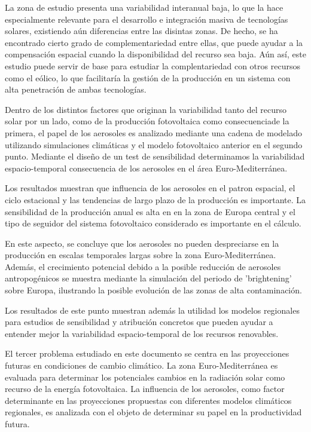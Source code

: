 La zona de estudio presenta una variabilidad interanual baja, lo que la hace especialmente relevante para el desarrollo e integración masiva de tecnologías solares, existiendo aún diferencias entre las disintas zonas. De hecho, se ha encontrado cierto grado de complementariedad entre ellas, que puede ayudar a la compensación espacial cuando la disponibilidad del recurso sea baja. Aún así, este estudio puede servir de base para estudiar la complentariedad con otros recursos como el eólico, lo que facilitaría la gestión de la producción en un sistema con alta penetración de ambas tecnologías.

Dentro de los distintos factores que originan la variabilidad tanto del recurso solar por un lado, como de la producción fotovoltaica como consecuenciade la primera, el papel de los aerosoles es analizado mediante una cadena de modelado utilizando simulaciones climáticas y el modelo fotovoltaico anterior en el segundo punto. Mediante el diseño de un test de sensibilidad determinamos la variabilidad espacio-temporal consecuencia de los aerosoles en el área Euro-Mediterránea.

Los resultados \cite*{Gutierrez2018} muestran que influencia de los aerosoles en el patron espacial, el ciclo estacional y las tendencias de largo plazo de la producción es importante. La sensibilidad de la producción anual es alta en en la zona de Europa central y el tipo de seguidor del sistema fotovoltaico considerado es importante en el cálculo.

En este aspecto, se concluye que los aerosoles no pueden despreciarse en la producción en escalas temporales largas sobre la zona Euro-Mediterránea. Además, el crecimiento potencial debido a la posible reducción de aerosoles antropogénicos se muestra mediante la simulación del periodo de 'brightening' sobre Europa, ilustrando la posible evolución de las zonas de alta contaminación.

Los resultados de este punto muestran además la utilidad los modelos regionales para estudios de sensibilidad y atribución concretos que pueden ayudar a entender mejor la variabilidad espacio-temporal de los recursos renovables.

El tercer problema estudiado en este documento se centra en las proyecciones futuras en condiciones de cambio climático. La zona Euro-Mediterránea es evaluada para determinar los potenciales cambios en la radiación solar como recurso de la energía fotovoltaica. La influencia de los aerosoles, como factor determinante en las proyecciones propuestas con diferentes modelos climáticos regionales, es analizada con el objeto de determinar su papel en la productividad futura.

